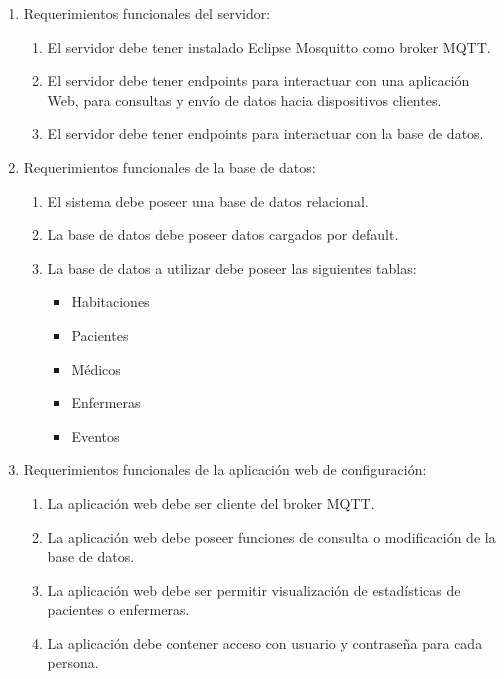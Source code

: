 \documentclass[
11pt, %
]{charter}
\begin{document}
\begin{enumerate}
	\item Requerimientos funcionales del servidor:
			\begin{enumerate}
			\item El servidor debe tener instalado Eclipse Mosquitto como broker MQTT.
			\item El servidor debe tener endpoints para interactuar con una aplicación Web, para consultas y envío de datos hacia dispositivos clientes.
			\item El servidor debe tener endpoints para interactuar con la base de datos.

			
			\end{enumerate}
	\item Requerimientos funcionales de la base de datos:
		\begin{enumerate}		
			\item El sistema debe poseer una base de datos relacional.
			\item La base de datos debe poseer datos cargados por default.
			\item La base de datos a utilizar debe poseer las siguientes tablas:
			\begin{itemize}
			
				\item Habitaciones
						
				\item Pacientes			
			
				\item Médicos
			
				\item Enfermeras			
			
				\item Eventos 
			\end{itemize}
		\end{enumerate}	
	\item Requerimientos funcionales de la aplicación web de configuración:
		\begin{enumerate}	
		\item La aplicación web debe ser cliente del broker MQTT.
		\item La aplicación web debe poseer funciones de consulta o modificación de la base de datos.
		\item La aplicación web debe ser permitir visualización de estadísticas de pacientes o enfermeras.
		\item La aplicación debe contener acceso con usuario y contraseña para cada persona.
		\end{enumerate}			
	

\end{enumerate}
\end{document}

